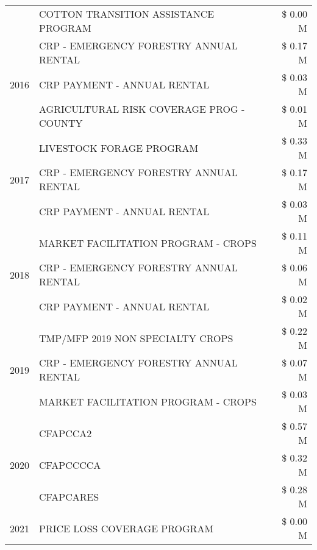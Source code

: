 \begin{tabular}{llr}
 & COTTON TRANSITION ASSISTANCE PROGRAM & \$ 0.00 M \\
\cline{1-3}
\multirow[t]{3}{*}{2016} & CRP - EMERGENCY FORESTRY ANNUAL RENTAL & \$ 0.17 M \\
 & CRP PAYMENT - ANNUAL RENTAL & \$ 0.03 M \\
 & AGRICULTURAL RISK COVERAGE PROG - COUNTY & \$ 0.01 M \\
\cline{1-3}
\multirow[t]{3}{*}{2017} & LIVESTOCK FORAGE PROGRAM & \$ 0.33 M \\
 & CRP - EMERGENCY FORESTRY ANNUAL RENTAL & \$ 0.17 M \\
 & CRP PAYMENT - ANNUAL RENTAL & \$ 0.03 M \\
\cline{1-3}
\multirow[t]{3}{*}{2018} & MARKET FACILITATION PROGRAM - CROPS & \$ 0.11 M \\
 & CRP - EMERGENCY FORESTRY ANNUAL RENTAL & \$ 0.06 M \\
 & CRP PAYMENT - ANNUAL RENTAL & \$ 0.02 M \\
\cline{1-3}
\multirow[t]{3}{*}{2019} & TMP/MFP 2019 NON SPECIALTY CROPS & \$ 0.22 M \\
 & CRP - EMERGENCY FORESTRY ANNUAL RENTAL & \$ 0.07 M \\
 & MARKET FACILITATION PROGRAM - CROPS & \$ 0.03 M \\
\cline{1-3}
\multirow[t]{3}{*}{2020} & CFAPCCA2 & \$ 0.57 M \\
 & CFAPCCCCA & \$ 0.32 M \\
 & CFAPCARES & \$ 0.28 M \\
\cline{1-3}
2021 & PRICE LOSS COVERAGE PROGRAM & \$ 0.00 M \\
\cline{1-3}
\bottomrule
\end{tabular}
